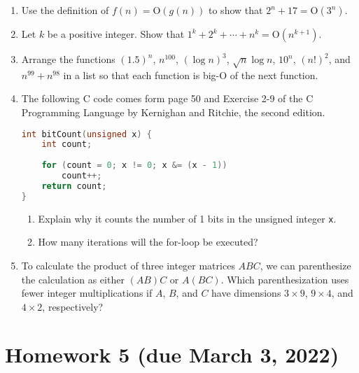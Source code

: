 \documentclass[letterpaper, 12pt]{article}
\begin{document}
\begin{enumerate}
    \item Use the definition of $f(n) = \mathrm{O}(g(n))$ to show that $2^n + 17 = \mathrm{O}(3^n)$.
    \item Let $k$ be a positive integer. Show that $1^k + 2^k + \cdots + n^k = \mathrm{O}(n^{k+1})$.
    \item Arrange the functions $(1.5)^n$, $n^{100}$, $(\log{n})^3$, $\sqrt{n}\log{n}$, $10^n$, $(n!)^2$, and $n^{99} + n^{98}$ in a list so that each function is big-$\mathrm{O}$ of the next function.
    \item The following C code comes form page 50 and Exercise 2-9 of the C Programming Language by Kernighan and Ritchie, the second edition.
    \begin{lstlisting}[language=C]
int bitCount(unsigned x) {
    int count;
    
    for (count = 0; x != 0; x &= (x - 1))
        count++;
    return count;
}\end{lstlisting}
    \begin{enumerate}
        \item Explain why it counts the number of 1 bits in the unsigned integer \texttt{x}.
        \item How many iterations will the for-loop be executed?
    \end{enumerate}
    \item To calculate the product of three integer matrices $ABC$, we can parenthesize the calculation as either $(AB)C$ or $A(BC)$. Which parenthesization uses fewer integer multiplications if $A$, $B$, and $C$ have dimensions $3 \times 9$, $9 \times 4$, and $4 \times 2$, respectively?
\end{enumerate}

\section*{Homework 5 (due March 3, 2022)}
\end{document}
